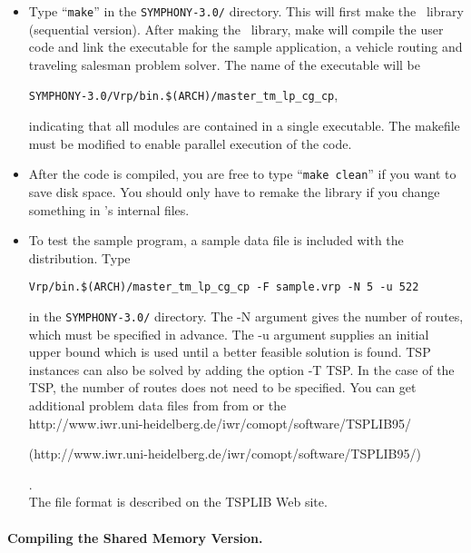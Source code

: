 \begin{itemize}
        \item Type ``{\tt make}'' in the {\tt SYMPHONY-3.0/} directory. This will
first make the \BB\ library (sequential version). After making the \BB\
library, make will compile the user code and link the executable for the
sample application, a vehicle routing and traveling salesman problem
solver. The name of the executable will be 
\begin{center}
{\tt SYMPHONY-3.0/Vrp/bin.\$(ARCH)/master\_tm\_lp\_cg\_cp}, 
\end{center}
indicating that all
modules are contained in a single executable. The makefile must be modified to
enable parallel execution of the code.

\item After the code is compiled, you are free to type ``{\tt make
        clean}'' if you want to save disk space. You
        should only have to remake the library if you change something
        in \BB's internal files.

\item To test the sample program, a sample data file is included with the
distribution. Type 
\begin{center}
{\tt Vrp/bin.\$(ARCH)/master\_tm\_lp\_cg\_cp -F sample.vrp
-N 5 -u 522} 
\end{center}
in the {\tt SYMPHONY-3.0/} directory. The -N argument gives the number
of routes, which must be specified in advance. The -u argument supplies an
initial upper bound which is used until a better feasible solution is
found. TSP instances can also be solved by adding the option -T TSP. In the
case of the TSP, the number of routes does not need to be specified. You can
get additional problem data files from from  or the
\\ 
{http://www.iwr.uni-heidelberg.de/iwr/comopt/software/TSPLIB95/}
\begin{latexonly}
        (http://www.iwr.uni-heidelberg.de/iwr/comopt/software/TSPLIB95/)
\end{latexonly}. \\
The file
format is described on the TSPLIB Web site.
\end{itemize}

\paragraph{Compiling the Shared Memory Version.}

